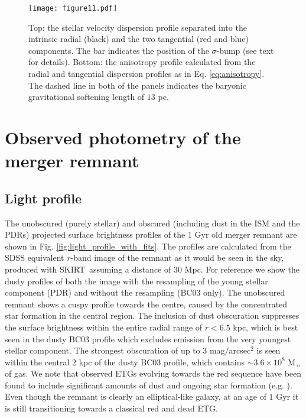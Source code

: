 \documentclass[a4paper,fleqn,usenatbib]{mnras}
\newcommand{\skirt}{\textsc{SKIRT}}
\begin{document}
\begin{figure}
\centering
\texttt{[image: figure11.pdf]}
    \caption{Top: the stellar velocity dispersion profile separated into the intrinsic radial (black) and the two tangential (red and blue)
    components. The bar indicates the position of the $\sigma$-bump (see text for details).
    Bottom: the anisotropy profile calculated from the radial and
    tangential dispersion profiles as in Eq. \ref{eq:anisotropy}.
    The dashed line in both of the panels indicates the baryonic gravitational softening length of 
    $13$ pc.}
    \label{fig:sigma_profiles}
\end{figure}






\section{Observed photometry of the merger remnant}\label{section:photometric_properties}

\subsection{Light profile}

The unobscured (purely 
stellar) and obscured (including dust in the ISM and the PDRs) 
projected surface brightness profiles of the $1$ Gyr old merger 
remnant are shown in Fig. \ref{fig:light_profile_with_fits}. The profiles are calculated from 
the SDSS equivalent $r$-band image of the remnant as it would be seen in the sky, produced with \skirt\ assuming a distance of $30$ Mpc. 
For reference we show the dusty profiles of both the image with the resampling of the young stellar component (PDR) and 
without the resampling (BC03 only). The unobscured remnant shows a cuspy 
profile towards the centre, caused by the concentrated star formation in the central region.
The inclusion of dust obscuration suppresses the surface brightness within the entire radial range
of $r<6.5$ kpc, which is best seen in the dusty BC03 profile which excludes emission from the very youngest stellar component.
The strongest obscuration of up to $3$ mag$/$arcsec$^2$ is seen within the central $2$ kpc of the dusty BC03 profile, which 
contains $\sim 3.6\times 10^8$ M$_{\sun}$ of gas.
We note that observed ETGs evolving towards the red sequence have been found to include
significant amounts of dust and ongoing star formation (e.g. \citealt{2012MNRAS.419.2545R}).
 Even though the remnant is clearly an elliptical-like galaxy, at an age of $1$ Gyr it is still transitioning towards a classical red and dead ETG. 
\end{document}
